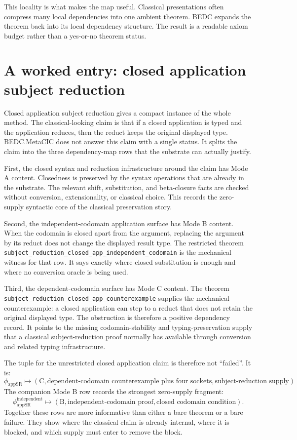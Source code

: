 This locality is what makes the map useful. Classical presentations often
compress many local dependencies into one ambient theorem. BEDC expands the
theorem back into its local dependency structure. The result is a readable
axiom budget rather than a yes-or-no theorem status.

\section{A worked entry: closed application subject reduction}
\label{sec:bedc-axiom-dependency-map-worked-entry}

Closed application subject reduction gives a compact instance of the whole
method. The classical-looking claim is that if a closed application is typed
and the application reduces, then the reduct keeps the original displayed
type. BEDC.MetaCIC does not answer this claim with a single status. It splits
the claim into the three dependency-map rows that the substrate can actually
justify.

First, the closed syntax and reduction infrastructure around the claim has
Mode A content. Closedness is preserved by the syntax operations that are
already in the substrate. The relevant shift, substitution, and beta-closure
facts are checked without conversion, extensionality, or classical choice.
This records the zero-supply syntactic core of the classical preservation
story.

Second, the independent-codomain application surface has Mode B content.
When the codomain is closed apart from the argument, replacing the argument by
its reduct does not change the displayed result type. The restricted theorem
\texttt{subject\_reduction\_closed\_app\_independent\_codomain} is the
mechanical witness for that row. It says exactly where closed substitution is
enough and where no conversion oracle is being used.

Third, the dependent-codomain surface has Mode C content. The theorem
\texttt{subject\_reduction\_closed\_app\_counterexample} supplies the
mechanical counterexample: a closed application can step to a reduct that does
not retain the original displayed type. The obstruction is therefore a
positive dependency record. It points to the missing codomain-stability and
typing-preservation supply that a classical subject-reduction proof normally
has available through conversion and related typing infrastructure.

The tuple for the unrestricted closed application claim is therefore not
``failed''. It is:
$$
\phi_{\mathrm{appSR}}
\mapsto
(\mathrm{C},
\text{dependent-codomain counterexample plus four sockets},
\text{subject-reduction supply}).
$$
The companion Mode B row records the strongest zero-supply fragment:
$$
\phi_{\mathrm{appSR}}^{\mathrm{independent}}
\mapsto
(\mathrm{B},
\text{independent-codomain proof},
\text{closed codomain condition}).
$$
Together these rows are more informative than either a bare theorem or a bare
failure. They show where the classical claim is already internal, where it is
blocked, and which supply must enter to remove the block.

